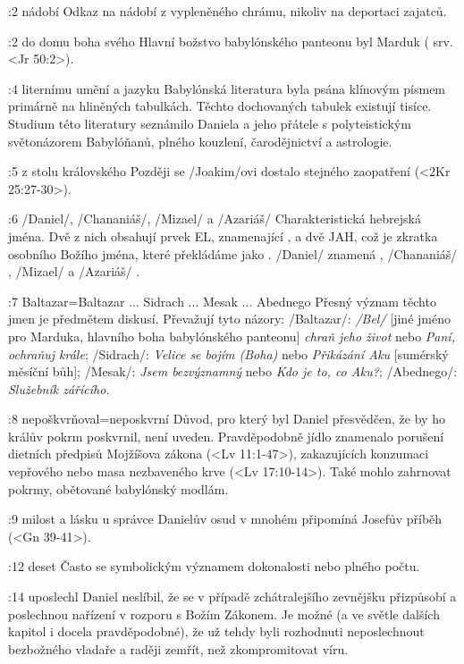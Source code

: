 :2 {nádobí} Odkaz na nádobí z vypleněného chrámu, nikoliv na deportaci zajatců.

:2 {do domu boha svého}  Hlavní božstvo babylónského panteonu byl Marduk  ( srv. <Jr 50:2>).

:4 {liternímu umění a jazyku} Babylónská literatura byla psána klínovým písmem primárně na hliněných tabulkách. Těchto dochovaných tabulek existují tisíce. Studium této literatury seznámilo Daniela a jeho přátele s polyteistickým světonázorem Babylóňanů, plného kouzlení, čarodějnictví a astrologie.

:5 {z stolu královského} Později se \x/Joakim/ovi dostalo stejného zaopatření (<2Kr 25:27-30>).

:6 {\x/Daniel/, \x/Chananiáš/, \x/Mizael/ a \x/Azariáš/} Charakteristická  hebrejská jména. Dvě z nich obsahují prvek EL, znamenající , a dvě JAH, což je zkratka osobního Božího jména, které překládáme jako .  \x/Daniel/ znamená , \x/Chananiáš/ , \x/Mizael/  a \x/Azariáš/ .

:7  {Baltazar}={Baltazar ... Sidrach ... Mesak ... Abednego}
     Přesný význam těchto jmen je předmětem diskusí. Převažují tyto názory: 
     \x/Baltazar/: {\it \x/Bel/} [jiné jméno pro Marduka, hlavního boha babylónského panteonu]
     {\em chraň jeho život} nebo {\em Paní, ochraňuj krále}; 
     \x/Sidrach/: {\em Velice se bojím (Boha)} nebo {\em Přikázání Aku} [sumérský měsíční bůh];
     \x/Mesak/:   {\em Jsem bezvýznamný} nebo {\em Kdo je to, co Aku?};
     \x/Abednego/: {\em Služebník zářícího.}
     
:8 {nepoškvrňoval}={neposkvrní} Důvod, pro který byl Daniel přesvědčen, že by ho králův pokrm poskvrnil, není uveden. Pravděpodobně jídlo znamenalo porušení dietních předpisů Mojžíšova zákona  (<Lv 11:1-47>), zakazujících konzumaci vepřového nebo masa nezbaveného krve (<Lv 17:10-14>). Také mohlo zahrnovat pokrmy, obětované babylónský modlám. 

:9 {milost a lásku u správce} Danielův osud v mnohém připomíná Josefův příběh (<Gn 39-41>).

:12 {deset} Často se symbolickým významem dokonalosti nebo plného počtu. \dopsat %

:14 {uposlechl} Daniel neslíbil, že se v případě zchátralejšího zevnějšku přizpůsobí a poslechnou nařízení v rozporu s Božím Zákonem. Je možné (a ve světle dalších kapitol i docela pravděpodobné), že už tehdy byli rozhodnuti neposlechnout bezbožného vladaře a raději zemřít, než zkompromitovat víru.


